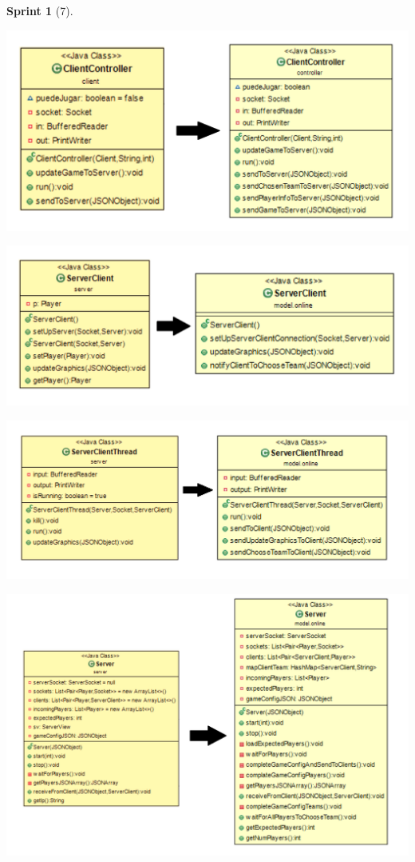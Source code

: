\documentclass{article}
\theoremstyle{break}
\newtheorem*{sprint}{Sprint}
\begin{document}
\begin{sprint}[7]
\begin{center}
\includegraphics[scale=0.3]{ClientController-evol.png} 
\end{center}

\begin{center}
\includegraphics[scale=0.3]{ServerClient-evol.png} 
\end{center}

\begin{center}
\includegraphics[scale=0.3]{ServerClientThread-evol.png} 
\end{center}

\begin{center}
\includegraphics[scale=0.3]{server-evol.png} 
\end{center}


\end{sprint}
\end{document}
